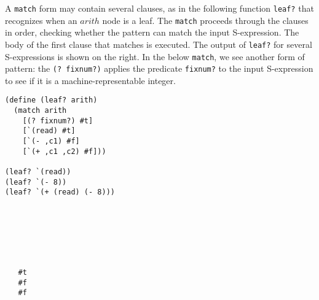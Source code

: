 \documentclass[12pt]{book}
\newcommand{\itm}[1]{\ensuremath{\mathit{#1}}}
\begin{document}
A \texttt{match} form may contain several clauses, as in the following
function \texttt{leaf?} that recognizes when an $\itm{arith}$ node is
a leaf. The \texttt{match} proceeds through the clauses in order,
checking whether the pattern can match the input S-expression. The
body of the first clause that matches is executed. The output of
\texttt{leaf?} for several S-expressions is shown on the right. In the
below \texttt{match}, we see another form of pattern: the \texttt{(?
  fixnum?)} applies the predicate \texttt{fixnum?} to the input
S-expression to see if it is a machine-representable integer.
\begin{center}
\begin{minipage}{0.5\textwidth}
\begin{lstlisting}
(define (leaf? arith)
  (match arith
    [(? fixnum?) #t]
    [`(read) #t]
    [`(- ,c1) #f]
    [`(+ ,c1 ,c2) #f]))

(leaf? `(read))
(leaf? `(- 8))
(leaf? `(+ (read) (- 8)))
\end{lstlisting}
\end{minipage}
\vrule
\begin{minipage}{0.25\textwidth}
\begin{lstlisting}






   #t
   #f
   #f
\end{lstlisting}
\end{minipage}
\end{center}



\end{document}
